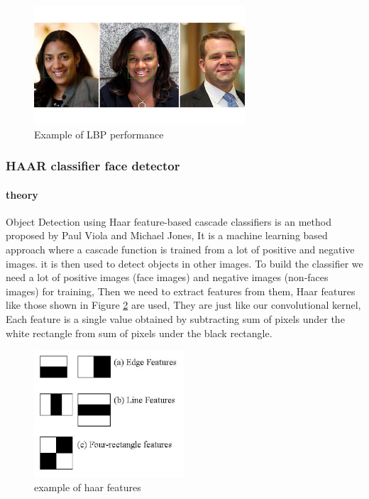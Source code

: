 \begin{figure}
	\centering
	\includegraphics[width=0.7\textwidth]{images/lbp_example.jpg}
	\caption{Example of LBP performance}
	\label{fig:LBP_example}
\end{figure}


\subsubsection{HAAR classifier face detector}

\paragraph{theory}
Object Detection using Haar feature-based cascade classifiers is an method proposed by Paul Viola and Michael Jones\cite{haar}, It is a machine learning based approach where a cascade function is trained from a lot of positive and negative images. it is then used to detect objects in other images.
\newline
To build the classifier we need a lot of positive images (face images) and negative images (non-faces images) for training, Then we need to extract features from them, Haar features like those shown in Figure \ref{fig:haar_features} are used, They are just like our convolutional kernel, Each feature is a single value obtained by subtracting sum of pixels under the white rectangle from sum of pixels under the black rectangle.

\begin{figure}
	\centering
	\includegraphics[width=0.5\textwidth]{images/haar_features.jpg}
	\caption{example of haar features}
	\label{fig:haar_features}
\end{figure}

